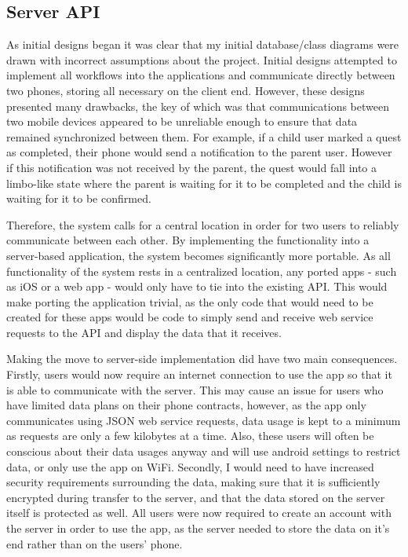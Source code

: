 \subsection{Server API}
As initial designs began it was clear that my initial database/class diagrams were drawn with incorrect assumptions about the project. 
Initial designs attempted to implement all workflows into the applications and communicate directly between two phones, storing all necessary on the client end. 
However, these designs presented many drawbacks, the key of which was that communications between two mobile devices appeared to be unreliable enough to ensure that data remained synchronized between them.
For example, if a child user marked a quest as completed, their phone would send a notification to the parent user.
However if this notification was not received by the parent, the quest would fall into a limbo-like state where the parent is waiting for it to be completed and the child is waiting for it to be confirmed.

Therefore, the system calls for a central location in order for two users to reliably communicate between each other.
By implementing the functionality into a server-based application, the system becomes significantly more portable. 
As all functionality of the system rests in a centralized location, any ported apps - such as iOS or a web app - would only have to tie into the existing API.
This would make porting the application trivial, as the only code that would need to be created for these apps would be code to simply send and receive web service requests to the API and display the data that it receives.

Making the move to server-side implementation did have two main consequences. 
Firstly, users would now require an internet connection to use the app so that it is able to communicate with the server.
This may cause an issue for users who have limited data plans on their phone contracts, however, as the app only communicates using JSON web service requests, data usage is kept to a minimum as requests are only a few kilobytes at a time.
Also, these users will often be conscious about their data usages anyway and will use android settings to restrict data, or only use the app on WiFi. 
Secondly, I would need to have increased security requirements surrounding the data, making sure that it is sufficiently encrypted during transfer to the server, and that the data stored on the server itself is protected as well.
All users were now required to create an account with the server in order to use the app, as the server needed to store the data on it's end rather than on the users' phone.


